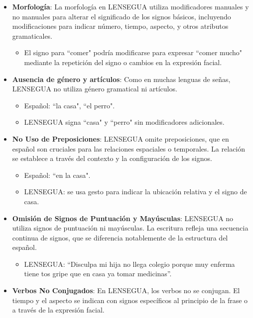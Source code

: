 \begin{itemize}
    \item \textbf{Morfología}: La morfología en LENSEGUA utiliza modificadores manuales y no manuales para alterar el significado de los signos básicos, incluyendo modificaciones para indicar número, tiempo, aspecto, y otros atributos gramaticales.
    \begin{itemize}
        \item El signo para ``comer" podría modificarse para expresar ``comer mucho" mediante la repetición del signo o cambios en la expresión facial.
    \end{itemize}
    \item \textbf{Ausencia de género y artículos}: Como en muchas lenguas de señas, LENSEGUA no utiliza género gramatical ni artículos.
    \begin{itemize}
        \item Español: ``la casa", ``el perro".
        \item LENSEGUA signa ``casa" y ``perro" sin modificadores adicionales.
    \end{itemize}
    \item \textbf{No Uso de Preposiciones}: LENSEGUA omite preposiciones, que en español son cruciales para las relaciones espaciales o temporales. La relación se establece a través del contexto y la configuración de los signos.
    \begin{itemize}
        \item Español: ``en la casa".
        \item LENSEGUA: se usa gesto para indicar la ubicación relativa y el signo de casa.
    \end{itemize}
    \item \textbf{Omisión de Signos de Puntuación y Mayúsculas}: LENSEGUA no utiliza signos de puntuación ni mayúsculas. La escritura refleja una secuencia continua de signos, que se diferencia notablemente de la estructura del español.
    \begin{itemize}
        \item LENSEGUA: ``Disculpa mi hija no llega colegio porque muy enferma tiene tos gripe que en casa ya tomar medicinas”.
    \end{itemize}
    \item \textbf{Verbos No Conjugados}: En LENSEGUA, los verbos no se conjugan. El tiempo y el aspecto se indican con signos específicos al principio de la frase o a través de la expresión facial.
    \begin{itemize}

\end{itemize}
\end{itemize}
